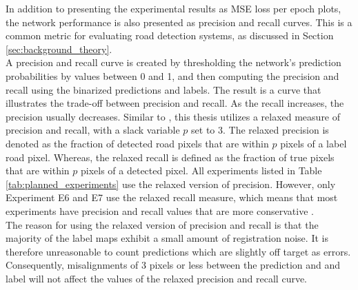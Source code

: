 In addition to presenting the experimental results as \ac{MSE} loss per epoch plots, the network performance is also presented as precision and recall curves. This is a common metric for evaluating road detection systems, as discussed in Section \ref{sec:background_theory}.\\

A precision and recall curve is created by thresholding the network's prediction probabilities by values between 0 and 1, and then computing the precision and recall using the binarized predictions and labels. The result is a curve that illustrates the trade-off between precision and recall. As the recall increases, the precision usually decreases. Similar to \citep{Mnih_aerial_images_noisy}, this thesis utilizes a relaxed measure of precision and recall, with a slack variable $p$ set to 3. The relaxed precision is denoted as the fraction of detected road pixels that are within $p$ pixels of a label road pixel. Whereas, the relaxed recall is defined as the fraction of true pixels that are within $p$ pixels of a detected pixel. All experiments listed in Table \ref{tab:planned_experiments} use the relaxed version of precision. However, only Experiment E6 and E7 use the relaxed recall measure, which means that most experiments have precision and recall values that are more conservative .\\

The reason for using the relaxed version of precision and recall is that the majority of the label maps exhibit a small amount of registration noise. It is therefore unreasonable to count predictions which are slightly off target as errors. Consequently, misalignments of 3 pixels or less between the prediction and and label will not affect the values of the relaxed precision and recall curve.\\



